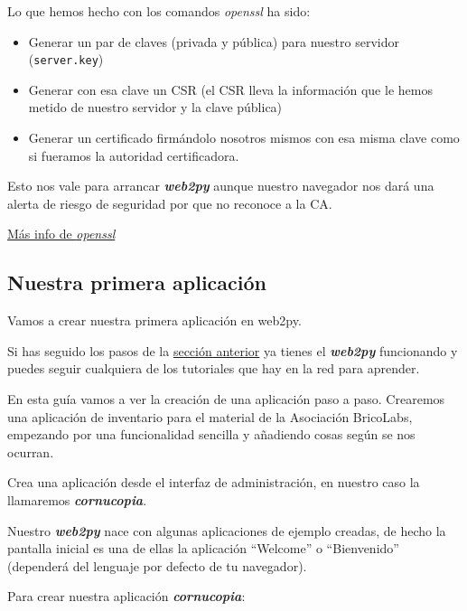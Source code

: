 \documentclass[
  12pt,
  spanish,
]{article}
\providecommand{\tightlist}{%
  \setlength{\itemsep}{0pt}\setlength{\parskip}{0pt}}
\begin{document}
\begin{description}
Lo que hemos hecho con los comandos \emph{openssl} ha sido:

\begin{itemize}
\tightlist
\item
  Generar un par de claves (privada y pública) para nuestro servidor
  (\texttt{server.key})
\item
  Generar con esa clave un CSR (el CSR lleva la información que le hemos
  metido de nuestro servidor y la clave pública)
\item
  Generar un certificado firmándolo nosotros mismos con esa misma clave
  como si fueramos la autoridad certificadora.
\end{itemize}

Esto nos vale para arrancar \textbf{\emph{web2py}} aunque nuestro
navegador nos dará una alerta de riesgo de seguridad por que no reconoce
a la CA.
\end{description}

\href{https://www.digitalocean.com/community/tutorials/openssl-essentials-working-with-ssl-certificates-private-keys-and-csrs}{Más
info de \emph{openssl}}

\hypertarget{nuestra-primera-aplicaciuxf3n}{%
\subsection{Nuestra primera
aplicación}\label{nuestra-primera-aplicaciuxf3n}}

Vamos a crear nuestra primera aplicación en web2py.

Si has seguido los pasos de la
\protect\hyperlink{instalaciuxf3n}{sección anterior} ya tienes el
\textbf{\emph{web2py}} funcionando y puedes seguir cualquiera de los
tutoriales que hay en la red para aprender.

En esta guía vamos a ver la creación de una aplicación paso a paso.
Crearemos una aplicación de inventario para el material de la Asociación
BricoLabs, empezando por una funcionalidad sencilla y añadiendo cosas
según se nos ocurran.

Crea una aplicación desde el interfaz de administración, en nuestro caso
la llamaremos \textbf{\emph{cornucopia}}.

Nuestro \textbf{\emph{web2py}} nace con algunas aplicaciones de ejemplo
creadas, de hecho la pantalla inicial es una de ellas la aplicación
``Welcome'' o ``Bienvenido'' (dependerá del lenguaje por defecto de tu
navegador).

Para crear nuestra aplicación \textbf{\emph{cornucopia}}:
\end{document}
